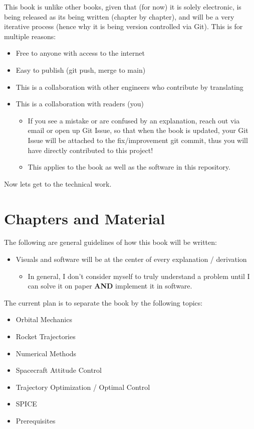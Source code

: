 \documentclass{article}
\begin{document}
This book is unlike other books, given that (for now) it is solely electronic, is being released as its being written (chapter by chapter),
and will be a very iterative process (hence why it is being version controlled via Git). This is for multiple reasons:
\begin{itemize}
	\item Free to anyone with access to the internet
	\item Easy to publish (git push, merge to main)
	\item This is a collaboration with other engineers who contribute by translating
	\item This is a collaboration with readers (you)
	\begin{itemize}
		\item If you see a mistake or are confused by an explanation, reach out
		via email or open up Git Issue, so that when the book is updated, your
		Git Issue will be attached to the fix/improvement git commit, thus you will have
		directly contributed to this project!
		\item This applies to the book as well as the software in this repository.
	\end{itemize}
\end{itemize}

Now lets get to the technical work.

\section{Chapters and Material}
The following are general guidelines of how this book will be written:
\begin{itemize}
	\item Visuals and software will be at the center of every explanation / derivation
	\begin{itemize}
		\item In general, I don't consider myself to truly understand a problem until I can solve it on paper \textbf{AND} implement it in software.
	\end{itemize}

\end{itemize}

\noindent
The current plan is to separate the book by the following topics:
\begin{itemize}
	\item Orbital Mechanics
	\item Rocket Trajectories
	\item Numerical Methods
	\item Spacecraft Attitude Control
	\item Trajectory Optimization / Optimal Control
	\item SPICE
	\item Prerequisites
\end{itemize}
 
\end{document}
